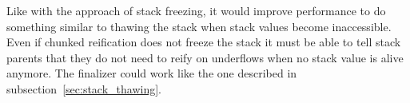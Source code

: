 Like with the approach of stack freezing, it would improve performance to do
something similar to thawing the stack when stack values become inaccessible.
Even if chunked reification does not freeze the stack it must be able to tell
stack parents that they do not need to reify on underflows when no stack value
is alive anymore.  The finalizer could work like the one described in
subsection~\ref{sec:stack_thawing}.
